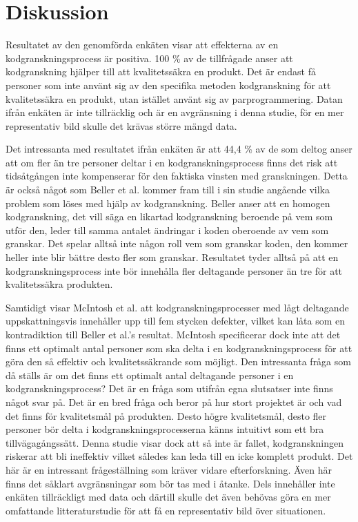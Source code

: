 \section{Diskussion}
\label{sec:discussion-wallstrom}
Resultatet av den genomförda enkäten visar att effekterna av en kodgranskningsprocess är positiva. 100 \% av de tillfrågade anser att kodgranskning hjälper till att kvalitetssäkra en produkt. Det är endast få personer som inte använt sig av den specifika metoden kodgranskning för att kvalitetssäkra en produkt, utan istället använt sig av parprogrammering. Datan ifrån enkäten är inte tillräcklig och är en avgränsning i denna studie, för en mer representativ bild skulle det krävas större mängd data. 

Det intressanta med resultatet ifrån enkäten är att 44,4 \% av de som deltog anser att om fler än tre personer deltar i en kodgranskningsprocess finns det risk att tidsåtgången inte kompenserar för den faktiska vinsten med granskningen. Detta är också något som Beller et al. \cite{beller2014modern} kommer fram till i sin studie angående vilka problem som löses med hjälp av kodgranskning. Beller anser att en homogen kodgranskning, det vill säga en likartad kodgranskning beroende på vem som utför den, leder till samma antalet ändringar i koden oberoende av vem som granskar. Det spelar alltså inte någon roll vem som granskar koden, den kommer heller inte blir bättre desto fler som granskar. Resultatet tyder alltså på att en kodgranskningsprocess inte bör innehålla fler deltagande personer än tre för att kvalitetssäkra produkten. 

Samtidigt visar McIntosh et al. \cite{mcintosh2014impact} att kodgranskningsprocesser med lågt deltagande uppskattningsvis innehåller upp till fem stycken defekter, vilket kan låta som en kontradiktion till Beller et al.'s \cite{beller2014modern} resultat. McIntosh specificerar dock inte att det finns ett optimalt antal personer som ska delta i en kodgranskningsprocess för att göra den så effektiv och kvalitetssäkrande som möjligt. Den intressanta fråga som då ställs är om det finns ett optimalt antal deltagande personer i en kodgranskningsprocess? Det är en fråga som utifrån egna slutsatser inte finns något svar på. Det är en bred fråga och beror på hur stort projektet är och vad det finns för kvalitetsmål på produkten. Desto högre kvalitetsmål, desto fler personer bör delta i kodgranskningsprocesserna känns intuitivt som ett bra tillvägagångssätt. Denna studie visar dock att så inte är fallet, kodgranskningen riskerar att bli ineffektiv vilket således kan leda till en icke komplett produkt. Det här är en intressant frågeställning som kräver vidare efterforskning. Även här finns det såklart avgränsningar som bör tas med i åtanke. Dels innehåller inte enkäten tillräckligt med data och därtill skulle det även behövas göra en mer omfattande litteraturstudie för att få en representativ bild över situationen.

